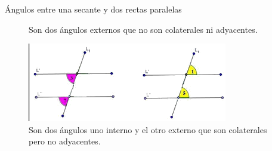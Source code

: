 \begin{notecard}{Ángulos entre una secante y dos rectas paralelas}
\begin{tcbitemize}
\begin{figure}[H]
            \caption{Son dos ángulos externos que no son colaterales ni adyacentes.}
            \label{fig:angulos_alternos_externos}
        \end{figure}
        \tcbitem[adjusted title={Ángulos Correspondientes}]
        \begin{figure}[H]
            \centering
            \includegraphics[width=\linewidth]{../images/angulos_correspondientes}
            \caption{Son dos ángulos uno interno y el otro externo que son colaterales pero no adyacentes.}
            \label{fig:angulos_correspondientes}
        \end{figure}
    \end{tcbitemize}
\end{notecard}